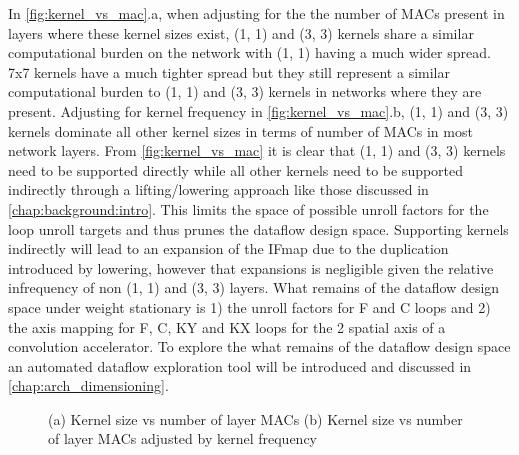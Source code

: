 In \autoref{fig:kernel_vs_mac}.a, when adjusting for the the number of MACs
present in layers where these kernel sizes exist, (1, 1) and (3, 3) kernels share a
similar computational burden on the network with (1, 1) having a much wider spread.
7x7 kernels have a much tighter spread but they still represent a similar
computational burden to (1, 1) and (3, 3) kernels in networks where they are present.
Adjusting for kernel frequency in \autoref{fig:kernel_vs_mac}.b, (1, 1) and (3, 3)
kernels dominate all other kernel sizes in terms of number of MACs in most
network layers. From \autoref{fig:kernel_vs_mac} it is clear that (1, 1) and (3, 3)
kernels need to be supported directly while all other kernels need to be
supported indirectly through a lifting/lowering approach like those discussed in
\autoref{chap:background:intro}. This limits the space of possible unroll
factors for the loop unroll targets and thus prunes the dataflow design space.
Supporting kernels indirectly will lead to an expansion of the IFmap due to the
duplication introduced by lowering, however that expansions is negligible given
the relative infrequency of non (1, 1) and (3, 3) layers. What remains of the dataflow
design space under weight stationary is 1) the unroll factors for F and C loops
and 2) the axis mapping for F, C, KY and KX loops for the 2 spatial axis of a
convolution accelerator. To explore the what remains of the dataflow design
space an automated dataflow exploration tool will be introduced and discussed in
\autoref{chap:arch_dimensioning}.   

\clearpage
\begin{figure}
    \centering
    \caption{(a) Kernel size vs number of layer MACs  (b) Kernel size vs number of layer MACs adjusted by kernel frequency}
    \label{fig:kernel_vs_mac}
\end{figure}

